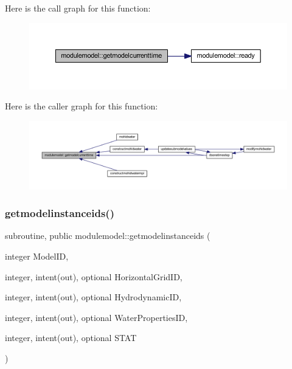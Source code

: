Here is the call graph for this function\+:\nopagebreak
\begin{figure}[H]
\begin{center}
\leavevmode
\includegraphics[width=350pt]{namespacemodulemodel_a16524bfd3d2f97fbf9b45e5e99e495e8_cgraph}
\end{center}
\end{figure}
Here is the caller graph for this function\+:\nopagebreak
\begin{figure}[H]
\begin{center}
\leavevmode
\includegraphics[width=350pt]{namespacemodulemodel_a16524bfd3d2f97fbf9b45e5e99e495e8_icgraph}
\end{center}
\end{figure}
\mbox{\label{namespacemodulemodel_a542c4b413e51723c7c3826e7a1e3b8a6}} 
\subsubsection{\texorpdfstring{getmodelinstanceids()}{getmodelinstanceids()}}
{\footnotesize\ttfamily subroutine, public modulemodel\+::getmodelinstanceids (\begin{DoxyParamCaption}\item[{integer}]{Model\+ID,  }\item[{integer, intent(out), optional}]{Horizontal\+Grid\+ID,  }\item[{integer, intent(out), optional}]{Hydrodynamic\+ID,  }\item[{integer, intent(out), optional}]{Water\+Properties\+ID,  }\item[{integer, intent(out), optional}]{S\+T\+AT }\end{DoxyParamCaption})}

